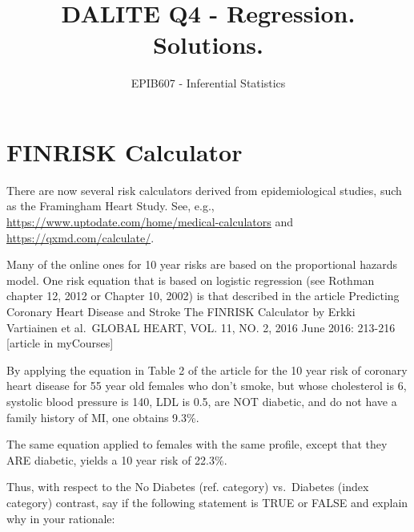 \documentclass[letterpaper,9pt,twoside,]{pinp}
\title{DALITE Q4 - Regression. Solutions.}
\author[a]{EPIB607 - Inferential Statistics}
\affil[a]{Fall 2020, McGill University}
\begin{document}
\verticaladjustment{-2pt}

\maketitle
\thispagestyle{firststyle}



\hypertarget{finrisk-calculator}{%
\section*{FINRISK Calculator}\label{finrisk-calculator}}

There are now several risk calculators derived from epidemiological
studies, such as the Framingham Heart Study. See, e.g.,
\url{https://www.uptodate.com/home/medical-calculators} and
\url{https://qxmd.com/calculate/}.

Many of the online ones for 10 year risks are based on the proportional
hazards model. One risk equation that is based on logistic regression
(see Rothman chapter 12, 2012 or Chapter 10, 2002) is that described in
the article Predicting Coronary Heart Disease and Stroke The FINRISK
Calculator by Erkki Vartiainen et al.~GLOBAL HEART, VOL. 11, NO. 2, 2016
June 2016: 213-216 {[}article in myCourses{]}

By applying the equation in Table 2 of the article for the 10 year risk
of coronary heart disease for 55 year old females who don't smoke, but
whose cholesterol is 6, systolic blood pressure is 140, LDL is 0.5, are
NOT diabetic, and do not have a family history of MI, one obtains 9.3\%.

The same equation applied to females with the same profile, except that
they ARE diabetic, yields a 10 year risk of 22.3\%.

Thus, with respect to the No Diabetes (ref. category) vs.~Diabetes
(index category) contrast, say if the following statement is TRUE or
FALSE and explain why in your rationale:
\end{document}

